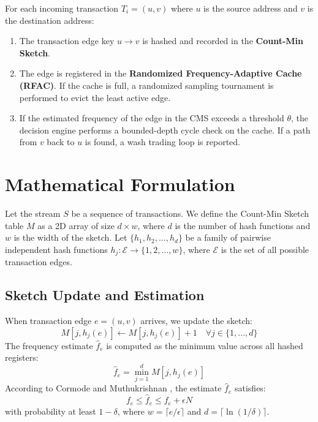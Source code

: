 \documentclass[conference]{IEEEtran}
\begin{document}
For each incoming transaction $T_i = (u, v)$ where $u$ is the source address and $v$ is the destination address:
\begin{enumerate}
    \item The transaction edge key $u \to v$ is hashed and recorded in the \textbf{Count-Min Sketch}.
    \item The edge is registered in the \textbf{Randomized Frequency-Adaptive Cache (RFAC)}. If the cache is full, a randomized sampling tournament is performed to evict the least active edge.
    \item If the estimated frequency of the edge in the CMS exceeds a threshold $\theta$, the decision engine performs a bounded-depth cycle check on the cache. If a path from $v$ back to $u$ is found, a wash trading loop is reported.
\end{enumerate}

\section{Mathematical Formulation}
Let the stream $S$ be a sequence of transactions. We define the Count-Min Sketch table $M$ as a 2D array of size $d \times w$, where $d$ is the number of hash functions and $w$ is the width of the sketch. Let $\{h_1, h_2, \dots, h_d\}$ be a family of pairwise independent hash functions $h_j: \mathcal{E} \to \{1, 2, \dots, w\}$, where $\mathcal{E}$ is the set of all possible transaction edges.

\subsection{Sketch Update and Estimation}
When transaction edge $e = (u, v)$ arrives, we update the sketch:
\begin{equation}
M[j, h_j(e)] \leftarrow M[j, h_j(e)] + 1 \quad \forall j \in \{1, \dots, d\}
\end{equation}
The frequency estimate $\hat{f}_e$ is computed as the minimum value across all hashed registers:
\begin{equation}
\hat{f}_e = \min_{j=1}^d M[j, h_j(e)]
\end{equation}
According to Cormode and Muthukrishnan \cite{b3}, the estimate $\hat{f}_e$ satisfies:
\begin{equation}
f_e \le \hat{f}_e \le f_e + \epsilon N
\end{equation}
with probability at least $1 - \delta$, where $w = \lceil e/\epsilon \rceil$ and $d = \lceil \ln(1/\delta) \rceil$.
\end{document}
